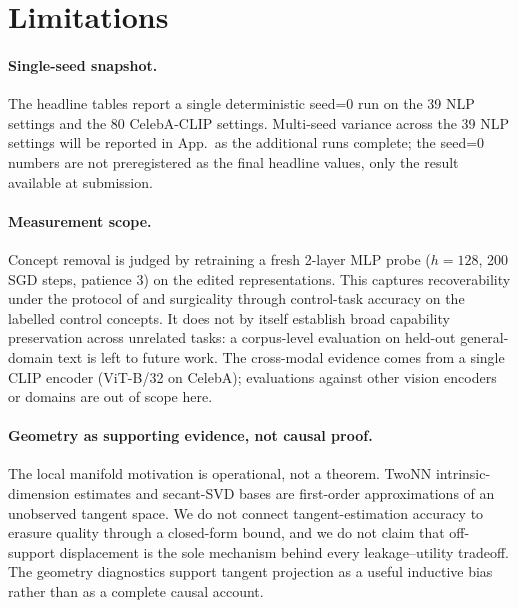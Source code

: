 \section{Limitations}

\paragraph{Single-seed snapshot.} The headline tables report a single deterministic seed=0 run on the 39 NLP settings and the 80 CelebA-CLIP settings. Multi-seed variance across the 39 NLP settings will be reported in App.\ as the additional runs complete; the seed=0 numbers are not preregistered as the final headline values, only the result available at submission.

\paragraph{Measurement scope.} Concept removal is judged by retraining a fresh 2-layer MLP probe ($h{=}128$, 200 SGD steps, patience 3) on the edited representations. This captures recoverability under the protocol of \citet{elazar-goldberg-2018-adversarial} and surgicality through control-task accuracy on the labelled control concepts. It does not by itself establish broad capability preservation across unrelated tasks: a corpus-level evaluation on held-out general-domain text is left to future work. The cross-modal evidence comes from a single CLIP encoder (ViT-B/32 on CelebA); evaluations against other vision encoders or domains are out of scope here.

\paragraph{Geometry as supporting evidence, not causal proof.} The local manifold motivation is operational, not a theorem. TwoNN intrinsic-dimension estimates and secant-SVD bases are first-order approximations of an unobserved tangent space. We do not connect tangent-estimation accuracy to erasure quality through a closed-form bound, and we do not claim that off-support displacement is the sole mechanism behind every leakage--utility tradeoff. The geometry diagnostics support tangent projection as a useful inductive bias rather than as a complete causal account.

